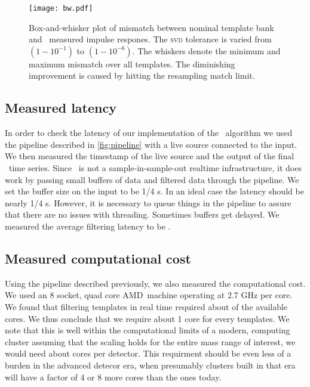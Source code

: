 \begin{figure}
	\label{fig:hist}
	\begin{center}
		\texttt{[image: bw.pdf]}
		\caption{Box-and-whisker plot of mismatch between nominal
template bank and \lloid\ measured impulse respones.  The \textsc{svd}
tolerance is varied from $\left(1-10^{-1}\right)$ to $\left(1-10^{-6}\right)$.
The whiskers denote the minimum and maximum mismatch over all templates.  The
diminishing improvement is caused by hitting the resampling match limit.}
	\end{center}
\end{figure}


\subsection{Measured latency}

In order to check the latency of our implementation of the \lloid\ algorithm we
used the pipeline described in \ref{fig:pipeline} with a live source connected
to the input.  We then measured the timestamp of the live source and the output
of the final \SNR\ time series.  Since \gstreamer\ is not a
sample-in-sample-out realtime infrastructure, it does work by passing small
buffers of data and filtered data through the pipeline.  We set the buffer size
on the input to be 1/4 s.  In an ideal case the latency should be nearly 1/4 s.
However, it is necessary to queue things in the pipeline to assure that there
are no issues with threading. Sometimes buffers get delayed.  We measured the
average filtering latency to be .

\subsection{Measured computational cost}

Using the pipeline described previously, we also measured the computational
cost.  We used an 8 socket, quad core AMD\texttrademark\ machine operating at
2.7 GHz per core.  We found that filtering  templates in real time
required about  of the available cores.  We thus conclude that we
require about 1 core for every  templates.  We note that this is
well within the computational limits of a modern, computing cluster assuming
that the scaling holds for the entire mass range of interest, we would need
about  cores per detector.  This requirment should be even less of a
burden in the advanced detecor era, when presumably clusters built in that era
will have a factor of 4 or 8 more cores than the ones today. 

